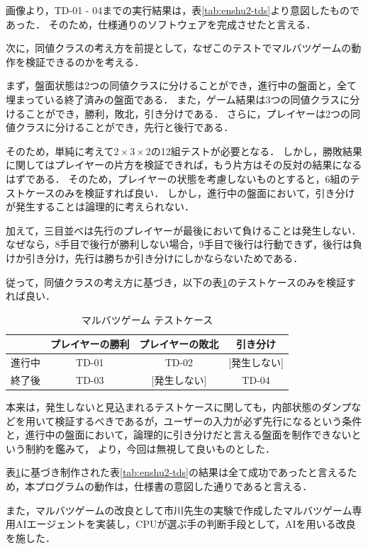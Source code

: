 \documentclass[platex,dvipdfmx,12pt]{jsarticle}
\begin{document}
画像より，TD-01 - 04までの実行結果は，表\ref{tab:enshu2-tds}より意図したものであった．
そのため，仕様通りのソフトウェアを完成させたと言える．

次に，同値クラスの考え方を前提として，なぜこのテストでマルバツゲームの動作を検証できるのかを考える．

まず，盤面状態は2つの同値クラスに分けることができ，進行中の盤面と，全て埋まっている終了済みの盤面である．
また，ゲーム結果は3つの同値クラスに分けることができ，勝利，敗北，引き分けである．
さらに，プレイヤーは2つの同値クラスに分けることができ，先行と後行である．

そのため，単純に考えて$2\times 3\times 2$の12組テストが必要となる．
しかし，勝敗結果に関してはプレイヤーの片方を検証できれば，もう片方はその反対の結果になるはずである．
そのため，プレイヤーの状態を考慮しないものとすると，6組のテストケースのみを検証すれば良い．
しかし，進行中の盤面において，引き分けが発生することは論理的に考えられない．

加えて，三目並べは先行のプレイヤーが最後において負けることは発生しない．
なぜなら，8手目で後行が勝利しない場合，9手目で後行は行動できず，後行は負けか引き分け，先行は勝ちか引き分けにしかならないためである．

従って，同値クラスの考え方に基づき，以下の表\ref{tab:enshu2-cross}のテストケースのみを検証すれば良い．

\begin{table}[H]
  \centering
  \caption{マルバツゲーム テストケース}
  \label{tab:enshu2-cross}
  \begin{tabular}{c|ccc}
    & プレイヤーの勝利 & プレイヤーの敗北 & 引き分け \\
    \hline 
    進行中 & TD-01 & TD-02 & [発生しない] \\
    終了後 & TD-03 & [発生しない] & TD-04 \\
  \end{tabular}
\end{table}

本来は，発生しないと見込まれるテストケースに関しても，内部状態のダンプなどを用いて検証するべきであるが，ユーザーの入力が必ず先行になるという条件と，進行中の盤面において，論理的に引き分けだと言える盤面を制作できないという制約を鑑みて，
より，今回は無視して良いものとした．

表\ref{tab:enshu2-cross}に基づき制作された表\ref{tab:enshu2-tds}の結果は全て成功であったと言えるため，本プログラムの動作は，仕様書の意図した通りであると言える．


また，マルバツゲームの改良として市川先生の実験で作成したマルバツゲーム専用AIエージェントを実装し，CPUが選ぶ手の判断手段として，AIを用いる改良を施した．
\end{document}
